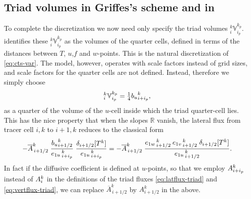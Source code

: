 \documentclass[../tex_main/NEMO_manual]{subfiles}
\begin{document}
\subsection{Triad volumes in Griffes's scheme and in \NEMO}
To complete the discretization we now need only specify the triad volumes $_i^k\mathbb{V}_{i_p}^{k_p}$.
\citet{Griffies_al_JPO98} identifies these $_i^k\mathbb{V}_{i_p}^{k_p}$ as the volumes of the quarter cells,
defined in terms of the distances between $T$, $u$,$f$ and $w$-points.
This is the natural discretization of \autoref{eq:cts-var}.
The \NEMO model, however, operates with scale factors instead of grid sizes,
and scale factors for the quarter cells are not defined.
Instead, therefore we simply choose
\begin{equation}
  \label{eq:V-NEMO}
  _i^k\mathbb{V}_{i_p}^{k_p}=\textstyle\frac{1}{4} {b_u}_{i+i_p}^k,
\end{equation}
as a quarter of the volume of the $u$-cell inside which the triad quarter-cell lies.
This has the nice property that when the slopes $\mathbb{R}$ vanish,
the lateral flux from tracer cell $i,k$ to $i+1,k$ reduces to the classical form
\begin{equation}
  \label{eq:lat-normal}
-\overline{{A}}_{\,i+1/2}^k\;
\frac{{b_u}_{i+1/2}^k}{{e_{1u}}_{\,i + i_p}^{\,k}}
\;\frac{\delta_{i+ 1/2}[T^k] }{{e_{1u}}_{\,i + i_p}^{\,k}}
 = -\overline{{A}}_{\,i+1/2}^k\;\frac{{e_{1w}}_{\,i + 1/2}^{\,k}\:{e_{1v}}_{\,i + 1/2}^{\,k}\;\delta_{i+ 1/2}[T^k]}{{e_{1u}}_{\,i + 1/2}^{\,k}}.
\end{equation}
In fact if the diffusive coefficient is defined at $u$-points,
so that we employ ${A}_{i+i_p}^k$ instead of  ${A}_i^k$ in the definitions of the triad fluxes
\autoref{eq:latflux-triad} and \autoref{eq:vertflux-triad},
we can replace $\overline{A}_{\,i+1/2}^k$ by $A_{i+1/2}^k$ in the above.
\end{document}
